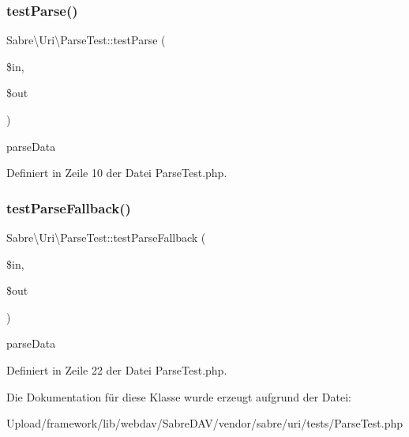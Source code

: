 \subsubsection{\texorpdfstring{test\+Parse()}{testParse()}}
{\footnotesize\ttfamily Sabre\textbackslash{}\+Uri\textbackslash{}\+Parse\+Test\+::test\+Parse (\begin{DoxyParamCaption}\item[{}]{\$in,  }\item[{}]{\$out }\end{DoxyParamCaption})}

parse\+Data 

Definiert in Zeile 10 der Datei Parse\+Test.\+php.

\mbox{\label{class_sabre_1_1_uri_1_1_parse_test_ae0a2cfed8c215667c7eea45f1c8e5de1}} 
\subsubsection{\texorpdfstring{test\+Parse\+Fallback()}{testParseFallback()}}
{\footnotesize\ttfamily Sabre\textbackslash{}\+Uri\textbackslash{}\+Parse\+Test\+::test\+Parse\+Fallback (\begin{DoxyParamCaption}\item[{}]{\$in,  }\item[{}]{\$out }\end{DoxyParamCaption})}

parse\+Data 

Definiert in Zeile 22 der Datei Parse\+Test.\+php.



Die Dokumentation für diese Klasse wurde erzeugt aufgrund der Datei\+:\begin{DoxyCompactItemize}
\item 
Upload/framework/lib/webdav/\+Sabre\+D\+A\+V/vendor/sabre/uri/tests/Parse\+Test.\+php\end{DoxyCompactItemize}

